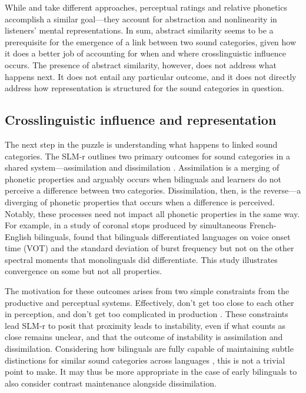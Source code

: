 While \citet{flege_2021_slmr} and \citet{chang_2015_similarity} take different approaches, perceptual ratings and relative phonetics accomplish a similar goal---they account for abstraction and nonlinearity in listeners' mental representations. In sum, abstract similarity seems to be a prerequisite for the emergence of a link between two sound categories, given how it does a better job of accounting for when and where crosslinguistic influence occurs. The presence of abstract similarity, however, does not address what happens next. It does not entail any particular outcome, and it does not directly address how representation is structured for the sound categories in question. 

\subsection{Crosslinguistic influence and representation}\label{ch4:sec:cli}

The next step in the puzzle is understanding what happens to linked sound categories. The SLM-r outlines two primary outcomes for sound categories in a shared system---assimilation and dissimilation \citep{flege_2021_slmr}. Assimilation is a merging of phonetic properties and arguably occurs when bilinguals and learners do not perceive a difference between two categories. Dissimilation, then, is the reverse---a diverging of phonetic properties that occurs when a difference is perceived. Notably, these processes need not impact all phonetic properties in the same way. For example, in a study of coronal stops produced by simultaneous French-English bilinguals, \citet{sundara_2006_production} found that bilinguals differentiated languages on voice onset time (VOT) and the standard deviation of burst frequency but not on the other spectral moments that monolinguals did differentiate. This study illustrates convergence on some but not all properties. 

The motivation for these outcomes arises from two simple constraints from the productive and perceptual systems. Effectively, don't get too close to each other in perception, and don't get too complicated in production \citep{guion_2003_systems, lindblom_1988_universals, flege_2021_slmr}. These constraints lead SLM-r to posit that proximity leads to instability, even if what counts as close remains unclear, and that the outcome of instability is assimilation and dissimilation. Considering how bilinguals are fully capable of maintaining subtle distinctions for similar sound categories across languages \citep[e.g.,][]{sundara_2006_production, lein_2016_vot, casillas_2021_interlingual}, this is not a trivial point to make. It may thus be more appropriate in the case of early bilinguals to also consider contrast maintenance alongside dissimilation. 

